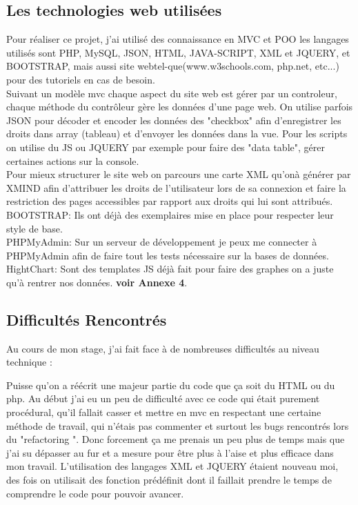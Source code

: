 \subsection{Les technologies web utilisées}
Pour réaliser ce projet, j'ai utilisé des connaissance en MVC et POO les langages utilisés sont PHP, MySQL, JSON, HTML, JAVA-SCRIPT, XML et JQUERY, et BOOTSTRAP, mais aussi site webtel-que(www.w3schools.com, php.net, etc...) pour des tutoriels en cas de besoin.\\
Suivant un modèle mvc chaque aspect du site web est gérer par un controleur, chaque méthode du contrôleur gère les données d'une page web. On utilise parfois JSON  pour décoder et encoder les données  des "checkbox" afin d'enregistrer les droits dans array (tableau) et d'envoyer les données dans la vue.
Pour les scripts on utilise du JS ou JQUERY par exemple pour faire des "data table", gérer certaines actions sur la console.\\
Pour mieux structurer le site web on parcours une carte XML qu'onà  générer par XMIND afin d'attribuer les droits de l'utilisateur lors de sa connexion et faire la restriction des pages accessibles par rapport aux droits qui lui sont attribués.\\
BOOTSTRAP: Ils ont déjà des exemplaires mise en place pour respecter leur style de base.\\
PHPMyAdmin: Sur un serveur de développement je peux me connecter à PHPMyAdmin afin de faire tout les tests nécessaire sur la bases de données.
HightChart: Sont des templates JS déjà fait pour faire des graphes on a juste qu'à rentrer nos données. \textbf{voir Annexe 4}. 

\subsection{Difficultés Rencontrés}
Au cours de mon stage, j'ai fait face à de nombreuses difficultés au niveau technique :

Puisse qu'on a réécrit une majeur partie du code que ça soit du HTML ou du php. 
Au début j'ai eu un peu de difficulté avec ce code qui était purement procédural, qu'il fallait casser et mettre en mvc en respectant une certaine méthode de travail, qui n'étais pas commenter  et surtout les bugs rencontrés lors du "refactoring ".
Donc forcement ça me prenais un peu plus de temps mais que j'ai su dépasser au fur et a mesure pour être plus à l'aise et plus efficace dans mon travail.
L'utilisation des langages XML et JQUERY étaient nouveau moi, des fois on utilisait des fonction prédéfinit dont il faillait prendre le temps de comprendre le code pour pouvoir avancer.   

























